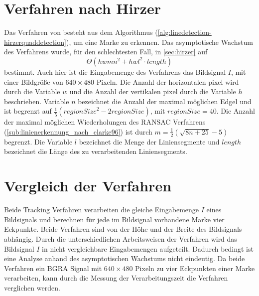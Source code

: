 \section{Verfahren nach Hirzer} %
\label{sec:ergebnisse-hirzer}
Das Verfahren von \citeauthor{hirzer08} besteht aus dem Algorithmus 
 (\autoref{alg:linedetection-hirzerquaddetection}), um eine Marke zu erkennen. Das asymptotische Wachstum des
 Verfahrens wurde, für den schlechtesten Fall, in \autoref{sec:hirzer} auf
\begin{equation*}
\Theta(hwmn^2+hwl^2\cdot\mathit{length})
\end{equation*}
bestimmt. Auch hier ist die Eingabemenge des Verfahrens das Bildsignal $I$, mit einer Bildgröße von $640 \times 480$
 Pixeln. Die Anzahl der horizontalen \gls{pixel} wird durch die Variable $w$ und die Anzahl der vertikalen
 \gls{pixel} durch die Variable $h$ beschrieben. Variable $n$ bezeichnet die Anzahl der maximal möglichen Edgel und ist
 begrenzt auf $\tfrac{1}{5}(\mathit{regionSize}^2 - 2\mathit{regionSize})$, mit $\mathit{regionSize} = 40$. Die Anzahl
 der maximal möglichen Wiederholungen des RANSAC Verfahrens (\autoref{sub:linienerkennung_nach_clarke96}) ist durch
 $m = \tfrac{1}{2}(\sqrt{8n + 25} - 5)$ begrenzt. Die Variable $l$ bezeichnet die Menge der Liniensegmente und
 $\mathit{length}$ bezeichnet die Länge des zu verarbeitenden Liniensegments.

\section{Vergleich der Verfahren} %
\label{sec:vergleich_der_verfahren}
Beide Tracking Verfahren verarbeiten die gleiche Eingabemenge $I$ eines Bildsignals und berechnen für jede im
 Bildsignal vorhandene Marke vier Eckpunkte. Beide Verfahren sind von der Höhe und der Breite des Bildsignals abhängig.
 Durch die unterschiedlichen Arbeitsweisen der Verfahren wird das Bildsignal $I$ in nicht vergleichbare Eingabemengen
 aufgeteilt. Dadurch bedingt ist eine Analyse anhand des asymptotischen Wachstums nicht eindeutig. Da beide Verfahren
 ein BGRA Signal mit $640 \times 480$ Pixeln zu vier Eckpunkten einer Marke verarbeiten, kann durch die Messung
 der Verarbeitungszeit die Verfahren verglichen werden.

